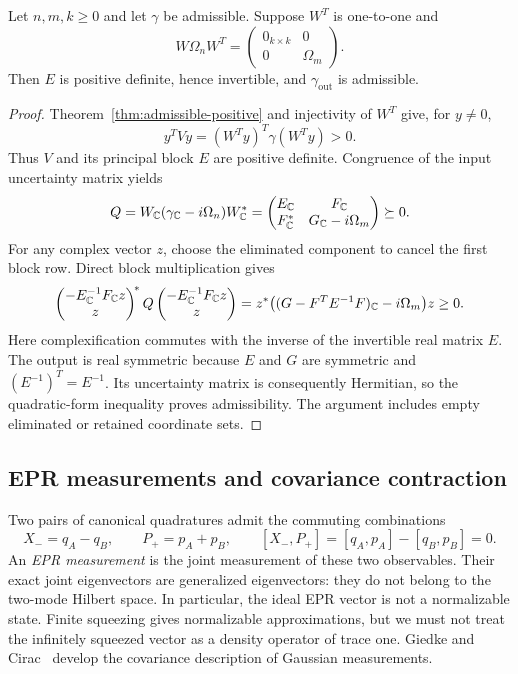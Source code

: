 \begin{theorem}\label{thm:contraction}
Let $n,m,k\geq0$ and let $\gamma$ be admissible. Suppose $W^T$ is one-to-one
and
\[
 W\Omega_nW^T=
 \begin{pmatrix}0_{k\times k}&0\\0&\Omega_m\end{pmatrix}.
\]
Then $E$ is positive definite, hence invertible, and
$\gamma_{\mathrm{out}}$ is admissible.
\end{theorem}
\begin{proof}
Theorem~\ref{thm:admissible-positive} and injectivity of $W^T$ give, for $y\ne0$,
\[
 y^TVy=(W^Ty)^T\gamma(W^Ty)>0.
\]
Thus $V$ and its principal block $E$ are positive definite. Congruence of the
input uncertainty matrix yields
\[
 Q=W_{\mathbb C}(\gamma_{\mathbb C}-i\Omega_n)W_{\mathbb C}^*
  =\begin{pmatrix}E_{\mathbb C}&F_{\mathbb C}\\F_{\mathbb C}^*&G_{\mathbb C}-i\Omega_m\end{pmatrix}
  \succeq0.
\]
For any complex vector $z$, choose the eliminated component to cancel the first
block row. Direct block multiplication gives
\[
 \begin{pmatrix}-E_{\mathbb C}^{-1}F_{\mathbb C}z\\z\end{pmatrix}^{\!*}
 Q\begin{pmatrix}-E_{\mathbb C}^{-1}F_{\mathbb C}z\\z\end{pmatrix}
 =z^*\bigl((G-F^TE^{-1}F)_{\mathbb C}-i\Omega_m\bigr)z\geq0.
\]
Here complexification commutes with the inverse of the invertible real matrix
$E$. The output is real symmetric because $E$ and $G$ are symmetric and
$(E^{-1})^T=E^{-1}$. Its uncertainty matrix is consequently Hermitian, so the
quadratic-form inequality proves admissibility. The argument includes empty
eliminated or retained coordinate sets.
\end{proof}

\subsection{EPR measurements and covariance contraction}
Two pairs of canonical quadratures admit the commuting combinations
\[
 X_-=q_A-q_B,\qquad P_+=p_A+p_B,\qquad
 [X_-,P_+]=[q_A,p_A]-[q_B,p_B]=0.
\]
An \emph{EPR measurement} is the joint measurement of these two observables.
Their exact joint eigenvectors are generalized eigenvectors: they do not belong
to the two-mode Hilbert space. In particular, the ideal EPR vector is not a
normalizable state. Finite squeezing gives normalizable approximations, but we
must not treat the infinitely squeezed vector as a density operator of trace one.
Giedke and Cirac~\cite[Secs.~III--IV]{giedke} develop the covariance description of
Gaussian measurements.

